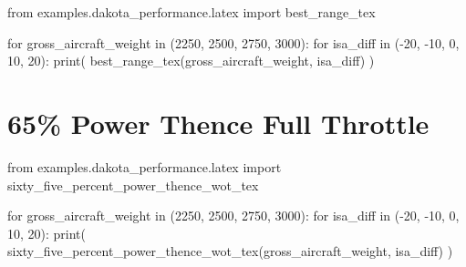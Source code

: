 \begin{pycode}
from examples.dakota_performance.latex import best_range_tex

for gross_aircraft_weight in (2250, 2500, 2750, 3000):
    for isa_diff in (-20, -10, 0, 10, 20):
        print(
            best_range_tex(gross_aircraft_weight, isa_diff)
        )
\end{pycode}

\section{65\% Power Thence Full Throttle}

\begin{pycode}
from examples.dakota_performance.latex import sixty_five_percent_power_thence_wot_tex

for gross_aircraft_weight in (2250, 2500, 2750, 3000):
    for isa_diff in (-20, -10, 0, 10, 20):
        print(
            sixty_five_percent_power_thence_wot_tex(gross_aircraft_weight, isa_diff)
        )
\end{pycode}
